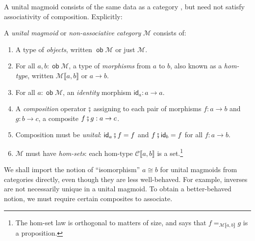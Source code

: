 \documentclass[runningheads]{llncs}
\newcommand*\rocqlogo{\usebox{\rocqlogobox}}
\newcommand{\lemmaref}[3]{\href{https://github.com/UniMath/UniMath/blob/94fae0eda57a778cec704bfa73b4ff525c9bc475/#1\#L#2?name=#3}{\rocqlogo}}
\newcommand{\acat}[1]{\mathcal{#1}}
\newcommand{\C}{\acat{C}}
\newcommand{\M}{\acat{M}}
\DeclareMathOperator{\ob}{\mathsf{ob}}
\newcommand{\id}{\mathsf{id}}
\newcommand{\dcomp}{\fatsemi}
\newcommand{\morsof}[3]{{#1}\llbracket{#2},{#3}\rrbracket}
\begin{document}
A unital magmoid consists of the same data as a category
\cite{Ahrens15}, but need not satisfy associativity of
composition. Explicitly:

\begin{definition}[{\lemmaref{UniMath/CategoryTheory/Nonassociative/UnitalMagmoids/Core.v}{126}{unital\_magmoid}}]
\label{def:umagmoid}
A \emph{unital magmoid} or \emph{non\hyp{}associative category} \(\M\) consists of:
\begin{enumerate}
\item A type of \emph{objects}, written \(\ob\M\) or just \(\M\).
\item For all \(a,b : \ob\M\), a type of
\emph{morphisms} from \(a\) to \(b\), also known as a
\emph{hom\hyp{}type}, written \(\morsof\M{a}{b}\) or \(a \to b\).
\item For all \(a : \ob\M\), an \emph{identity} morphism \(\id_a \colon a \to
   a\).
\item A \emph{composition} operator \(\dcomp\) assigning to each pair of
morphisms \(f \colon a \to b\) and \(g \colon b \to c\), a composite
\(f \dcomp g : a \to c\).
\item Composition must be \emph{unital}: \(\id_a \dcomp f = f\) and \(f \dcomp
   \id_b = f\) for all \(f \colon a \to b\).
\item \(\M\) must have \emph{hom\hyp{}sets}: each hom\hyp{}type \(\morsof\C{a}{b}\) is a
set.\footnote{The hom\hyp{}set law is orthogonal to matters of size, and says that
\(f =_{\morsof\M{a}{b}} g\) is a proposition.}
\end{enumerate}
\end{definition}

We shall import the notion of ``isomorphism'' \(a \cong b\) for unital magmoids from
categories directly, even though they are less well\hyp{}behaved. For
example, inverses are not necessarily unique in a unital magmoid. To
obtain a better\hyp{}behaved notion, we must require certain composites to
associate.
\end{document}
